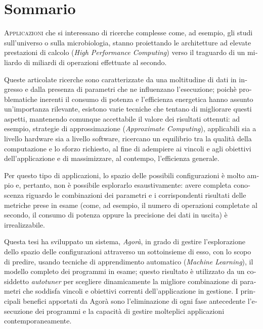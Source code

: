 \chapter*{Sommario}

\begin{otherlanguage}{italian}

\lettrine{A}{pplicazioni} che si interessano di ricerche complesse come, ad esempio, gli studi sull'universo o sulla microbiologia, stanno proiettando le architetture ad elevate prestazioni di calcolo (\textit{High Performance Computing}) verso il traguardo di un miliardo di miliardi di operazioni effettuate al secondo.

Queste articolate ricerche sono caratterizzate da una moltitudine di dati in ingresso e dalla presenza di parametri che ne influenzano l'esecuzione; poichè problematiche inerenti il consumo di potenza e l'efficienza energetica hanno assunto un'importanza rilevante, esistono varie tecniche che tentano di migliorare questi aspetti, mantenendo comunque accettabile il valore dei risultati ottenuti: ad esempio, strategie di approssimazione (\textit{Approximate Com\-put\-ing}), applicabili sia a livello hardware sia a livello software, ricercano un equilibrio tra la qualità della computazione e lo sforzo richiesto, al fine di adempiere ai vincoli e agli obiettivi dell'applicazione e di massimizzare, al contempo, l'efficienza generale.

Per questo tipo di applicazioni, lo spazio delle possibili configurazioni è molto ampio e, pertanto, non è possibile esplorarlo esaustivamente: avere completa conoscenza riguardo le combinazioni dei parametri e i corrispondenti risultati delle metriche prese in esame (come, ad esempio, il numero di operazioni completate al secondo, il consumo di potenza oppure la precisione dei dati in uscita) è irrealizzabile.

Questa tesi ha sviluppato un sistema, \textit{Agorà}, in grado di gestire l'esplorazione dello spazio delle configurazioni attraverso un sottoinsieme di esso, con lo scopo di predire, usando tecniche di apprendimento automatico (\textit{Machine Learning}), il modello completo dei programmi in esame; questo risultato è utilizzato da un cosiddetto \textit{autotuner} per sce\-glie\-re dinamicamente la migliore combinazione di parametri che soddisfa vincoli e obiettivi correnti dell'applicazione in gestione. I principali benefici apportati da Agorà sono l'eliminazione di ogni fase an\-te\-ce\-den\-te l'esecuzione dei programmi e la capacità di gestire molteplici applicazioni contemporaneamente.

\end{otherlanguage}
